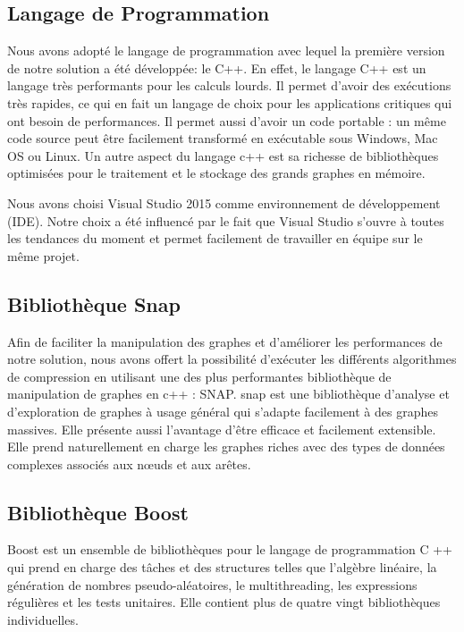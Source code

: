 \documentclass[a4paper,oneside,12pt]{report}
\theoremstyle{definition}
\begin{document}
		\subsection{Langage de Programmation}
		Nous avons adopté le langage de programmation avec lequel la    première version de notre solution a été développée: le C++. En effet, le langage C++ est un langage très performants pour les calculs lourds. Il permet d'avoir des exécutions très rapides, ce qui en fait un langage de choix pour les applications critiques qui ont besoin de performances. Il permet aussi d'avoir un code portable : un même code source peut être facilement transformé en exécutable sous Windows, Mac OS ou Linux. Un autre aspect du langage c++ est sa richesse de bibliothèques optimisées pour le traitement et le stockage des grands graphes en mémoire. 
		
		Nous avons choisi Visual Studio 2015 comme environnement de développement (IDE). Notre choix a été influencé par le fait que Visual Studio s'ouvre à toutes les tendances du moment et permet facilement de travailler en équipe sur le même projet.
		
		\subsection{Bibliothèque Snap}
		
		Afin de faciliter la manipulation des graphes et d'améliorer les performances de notre solution, nous avons offert la possibilité d'exécuter les différents algorithmes de compression en utilisant une des plus performantes bibliothèque de manipulation de graphes en c++ : SNAP.
		\gls{snap} est une bibliothèque d'analyse et d'exploration de graphes à usage général qui s'adapte facilement à des graphes massives. Elle présente aussi l'avantage d'être  efficace et facilement extensible. Elle prend naturellement en charge les graphes riches avec des types de données complexes associés aux nœuds et aux arêtes. 
		
		\subsection{Bibliothèque Boost}
		

Boost est un ensemble de bibliothèques pour le langage de programmation C ++ qui prend en charge des tâches et des structures telles que l'algèbre linéaire, la génération de nombres pseudo-aléatoires, le multithreading, les expressions régulières et les tests unitaires. Elle contient plus de quatre vingt bibliothèques individuelles.
\end{document}
